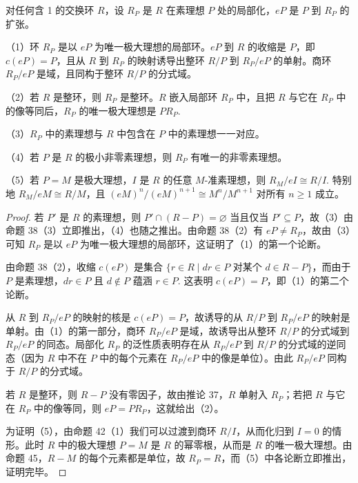 \begin{proposition}\label{pro:15.46}
对任何含 1 的交换环 \(R\)，设 \(R_P\) 是 \(R\) 在素理想 \(P\) 处的局部化，\(eP\) 是 \(P\) 到 \(R_P\) 的扩张。

（1）环 \(R_P\) 是以 \(eP\) 为唯一极大理想的局部环。\(eP\) 到 \(R\) 的收缩是 \(P\)，即 \(c(eP) = P\)，且从 \(R\) 到 \(R_P\) 的映射诱导出整环 \(R/P\) 到 \(R_P/eP\) 的单射。商环 \(R_P/eP\) 是域，且同构于整环 \(R/P\) 的分式域。

（2）若 \(R\) 是整环，则 \(R_P\) 是整环。\(R\) 嵌入局部环 \(R_P\) 中，且把 \(R\) 与它在 \(R_P\) 中的像等同后，\(R_P\) 的唯一极大理想是 \(PR_P\).

（3）\(R_P\) 中的素理想与 \(R\) 中包含在 \(P\) 中的素理想一一对应。

（4）若 \(P\) 是 \(R\) 的极小非零素理想，则 \(R_P\) 有唯一的非零素理想。

（5）若 \(P = M\) 是极大理想，\(I\) 是 \(R\) 的任意 \(M\)-准素理想，则 \(R_M/eI \cong R/I\). 特别地 \(R_M/eM \cong R/M\)，且 \((eM)^n/(eM)^{n+1} \cong M^n/M^{n+1}\) 对所有 \(n \geq 1\) 成立。
\end{proposition}

\begin{proof}
若 \(P'\) 是 \(R\) 的素理想，则 \(P' \cap (R-P) = \varnothing\) 当且仅当 \(P' \subseteq P\)，故（3）由命题 38（3）立即推出，（4）也随之推出。由命题 38（2）有 \(eP \neq R_P\)，故由（3）可知 \(R_P\) 是以 \(eP\) 为唯一极大理想的局部环，这证明了（1）的第一个论断。

由命题 38（2），收缩 \(c(eP)\) 是集合 \(\{r \in R \mid dr \in P \text{ 对某个 } d \in R-P\}\)，而由于 \(P\) 是素理想，\(dr \in P\) 且 \(d \notin P\) 蕴涵 \(r \in P\). 这表明 \(c(eP) = P\)，即（1）的第二个论断。

从 \(R\) 到 \(R_P/eP\) 的映射的核是 \(c(eP) = P\)，故诱导的从 \(R/P\) 到 \(R_P/eP\) 的映射是单射。由（1）的第一部分，商环 \(R_P/eP\) 是域，故诱导出从整环 \(R/P\) 的分式域到 \(R_P/eP\) 的同态。局部化 \(R_P\) 的泛性质表明存在从 \(R_P/eP\) 到 \(R/P\) 的分式域的逆同态（因为 \(R\) 中不在 \(P\) 中的每个元素在 \(R_P/eP\) 中的像是单位）。由此 \(R_P/eP\) 同构于 \(R/P\) 的分式域。

若 \(R\) 是整环，则 \(R-P\) 没有零因子，故由推论 37，\(R\) 单射入 \(R_P\)；若把 \(R\) 与它在 \(R_P\) 中的像等同，则 \(eP = PR_P\)，这就给出（2）。

为证明（5），由命题 42（1）我们可以过渡到商环 \(R/I\)，从而化归到 \(I = 0\) 的情形。此时 \(R\) 中的极大理想 \(P = M\) 是 \(R\) 的幂零根，从而是 \(R\) 的唯一极大理想。由命题 45，\(R-M\) 的每个元素都是单位，故 \(R_P = R\)，而（5）中各论断立即推出，证明完毕。
\end{proof}

